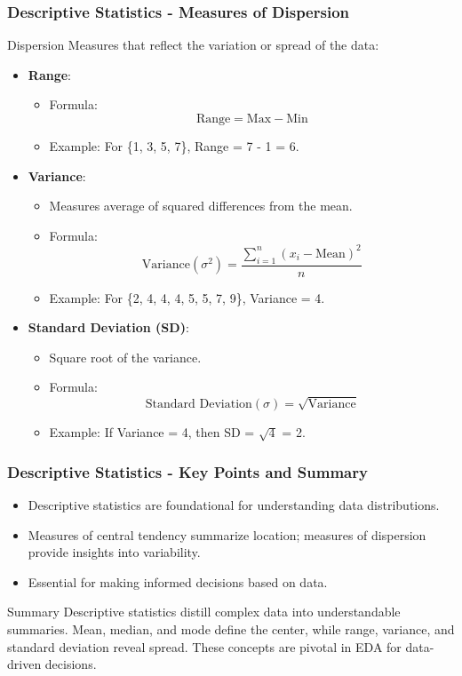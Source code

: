 \documentclass[aspectratio=169]{beamer}
\begin{document}
\begin{frame}[fragile]
    \frametitle{Descriptive Statistics - Measures of Dispersion}
    \begin{block}{Dispersion}
        Measures that reflect the variation or spread of the data:
    \end{block}
    \begin{itemize}
        \item \textbf{Range}:
            \begin{itemize}
                \item Formula: 
                \[
                \text{Range} = \text{Max} - \text{Min}
                \]
                \item Example: For \{1, 3, 5, 7\}, Range = 7 - 1 = 6.
            \end{itemize}
        \item \textbf{Variance}:
            \begin{itemize}
                \item Measures average of squared differences from the mean.
                \item Formula: 
                \[
                \text{Variance} (σ^2) = \frac{\sum_{i=1}^n (x_i - \text{Mean})^2}{n}
                \]
                \item Example: For \{2, 4, 4, 4, 5, 5, 7, 9\}, Variance = 4.
            \end{itemize}
        \item \textbf{Standard Deviation (SD)}:
            \begin{itemize}
                \item Square root of the variance.
                \item Formula: 
                \[
                \text{Standard Deviation} (σ) = \sqrt{\text{Variance}}
                \]
                \item Example: If Variance = 4, then SD = \(\sqrt{4}\) = 2.
            \end{itemize}
    \end{itemize}
\end{frame}

\begin{frame}[fragile]
    \frametitle{Descriptive Statistics - Key Points and Summary}
    \begin{itemize}
        \item Descriptive statistics are foundational for understanding data distributions.
        \item Measures of central tendency summarize location; measures of dispersion provide insights into variability.
        \item Essential for making informed decisions based on data.
    \end{itemize}
    \begin{block}{Summary}
        Descriptive statistics distill complex data into understandable summaries. Mean, median, and mode define the center, while range, variance, and standard deviation reveal spread. These concepts are pivotal in EDA for data-driven decisions.
    \end{block}
\end{frame}
\end{document}
